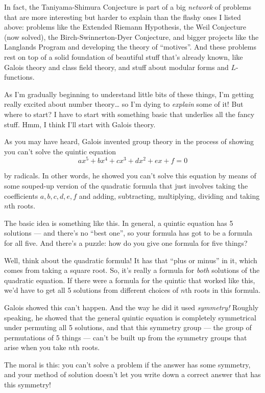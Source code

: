 \documentclass{article}
\begin{document}
In fact, the Taniyama-Shimura Conjecture is part of a big \emph{network}
of problems that are more interesting but harder to explain than the
flashy ones I listed above: problems like the Extended Riemann
Hypothesis, the Weil Conjecture (now solved), the Birch-Swinnerton-Dyer
Conjecture, and bigger projects like the Langlands Program and
developing the theory of ``motives''. And these problems rest on top of
a solid foundation of beautiful stuff that's already known, like Galois
theory and class field theory, and stuff about modular forms and
\(L\)-functions.

As I'm gradually beginning to understand little bits of these things,
I'm getting really excited about number theory\ldots{} so I'm dying to
\emph{explain} some of it! But where to start? I have to start with
something basic that underlies all the fancy stuff. Hmm, I think I'll
start with Galois theory.

As you may have heard, Galois invented group theory in the process of
showing you can't solve the quintic equation
\[ax^5 + bx^4 + cx^3 + dx^2 + ex + f = 0\]

by radicals. In other words, he showed you can't solve this equation by
means of some souped-up version of the quadratic formula that just
involves taking the coefficients \(a,b,c,d,e,f\) and adding,
subtracting, multiplying, dividing and taking \(n\)th roots.

The basic idea is something like this. In general, a quintic equation
has 5 solutions --- and there's no ``best one'', so your formula has got
to be a formula for all five. And there's a puzzle: how do you give one
formula for five things?

Well, think about the quadratic formula! It has that ``plus or minus''
in it, which comes from taking a square root. So, it's really a formula
for \emph{both} solutions of the quadratic equation. If there were a
formula for the quintic that worked like this, we'd have to get all 5
solutions from different choices of \(n\)th roots in this formula.

Galois showed this can't happen. And the way he did it used
\emph{symmetry!} Roughly speaking, he showed that the general quintic
equation is completely symmetrical under permuting all 5 solutions, and
that this symmetry group --- the group of permutations of 5 things ---
can't be built up from the symmetry groups that arise when you take
\(n\)th roots.

The moral is this: you can't solve a problem if the answer has some
symmetry, and your method of solution doesn't let you write down a
correct answer that has this symmetry!
\end{document}
